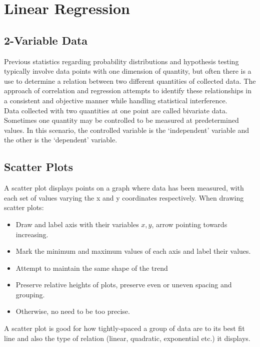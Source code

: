 \documentclass[../main]{subfiles}
\begin{document}
\section{Linear Regression}

	\subsection{2-Variable Data}

	Previous statistics regarding probability distributions and hypothesis testing typically involve data points with one dimension of quantity, but often there is a use to determine a relation between two different quantities of collected data. The approach of correlation and regression attempts to identify these relationships in a consistent and objective manner while handling statistical interference. \\

	Data collected with two quantities at one point are called bivariate data. Sometimes one quantity may be controlled to be measured at predetermined values. In this scenario, the controlled variable is the `independent' variable and the other is the `dependent' variable. \\

	\subsection{Scatter Plots}

	A scatter plot displays points on a graph where data has been measured, with each set of values varying the x and y coordinates respectively. When drawing scatter plots:

	\begin{itemize}
		\item Draw and label axis with their variables \(x,y\), arrow pointing towards increasing.
		\item Mark the minimum and maximum values of each axis and label their values.
		\item Attempt to maintain the same shape of the trend
		\item Preserve relative heights of plots, preserve even or uneven spacing and grouping.
		\item Otherwise, no need to be too precise.
	\end{itemize}

	A scatter plot is good for how tightly-spaced a group of data are to its best fit line and also the type of relation (linear, quadratic, exponential etc.) it displays.
\end{document}
